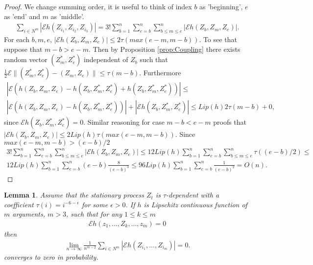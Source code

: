 \documentclass{article} %
\newtheorem{lemma}{Lemma}
\newcommand{\ev}{\mathcal{E}}
\begin{document}
\begin{proof}
We change summing order, it is useful to think of index $b$ as 'beginning', $e$ as 'end' and $m$ as 'middle'. 
 \begin{align}
 \label{eq:143}
 \sum_{i \in N^{m}} |\ev   h(Z_{i_1},Z_{i_2},Z_{i_3})| =  3! \sum_{b=1}^n \sum_{e=b}^n \sum_{b \leq m \leq e }^n |\ev   h(Z_b,Z_m,Z_e)|.
\end{align}
For each $b,m,e$, $|\ev   h(Z_b,Z_m,Z_e)| \leq 2 \tau(max(e-m,m-b))$. To see that suppose that $m-b>e-m$. Then by Proposition \ref{prop:Coupling} there exists random vector $(Z_m^*,Z_e^*)$ independent of $Z_b$ such that $\frac 1 2 \ev \parallel (Z_m^*,Z_e^*) - (Z_m,Z_e) \parallel \leq \tau(m-b)$. Furthermore 
\begin{align}
 |\ev   \left(   h(Z_b,Z_m,Z_e) -  h(Z_b,Z_m^*,Z_e^*) + h(Z_b,Z_m^*,Z_e^*) \right) | \leq  \\
 |\ev   \left(   h(Z_b,Z_m,Z_e) -  h(Z_b,Z_m^*,Z_e^*) \right) |+ |\ev h(Z_b,Z_m^*,Z_e^*) | \leq Lip(h) 2\tau(m-b) +0, 
\end{align}
since $\ev h(Z_b,Z_m^*,Z_e^*)=0$. Similar reasoning for case $m-b<e-m$ proofs that $|\ev h(Z_b,Z_m,Z_e)| \leq 2 Lip(h) \tau(max(e-m,m-b))$. Since $max(e-m,m-b)>(e-b)/2$   
\begin{align}
3! \sum_{b=1}^n \sum_{e=b}^n \sum_{b \leq m \leq e }^n |\ev h(Z_b,Z_m,Z_e)| \leq 12 Lip(h) \sum_{b=1}^n \sum_{e=b}^n \sum_{b \leq m \leq e }^n \tau((e-b)/2) \leq  \\ 
12 Lip(h) \sum_{b=1}^n \sum_{e=b}^n (e-b) \frac{8} {(e-b)^3} \leq 96 Lip(h) \sum_{b=1}^n \sum_{e=b}^n \frac{1} {(e-b)^2} = O(n).
\end{align}
\end{proof}


\begin{lemma}
\label{lem:missingBit}
Assume that the stationary process $Z_t$ is $\tau$-dependent with a coefficient $\tau(i) = i^{-6-\epsilon}$ for some $\epsilon>0$. If $h$ is Lipschitz continuous function of $m$ arguments, $m>3$, such that for any $1 \leq k \leq m$
\begin{align}
\label{eq:assumptionCanonical}
\ev h(z_1,...,Z_k,...,z_m) =0
\end{align}
then
\begin{align}
 \lim_{n \to \infty} \frac{1}{n^{m-2}} \sum_{i \in N^{m}} |\ev   h(Z_{i_1},...,Z_{i_m})| =0.
\end{align}
converges to zero in probability.
\end{lemma}
\end{document}
